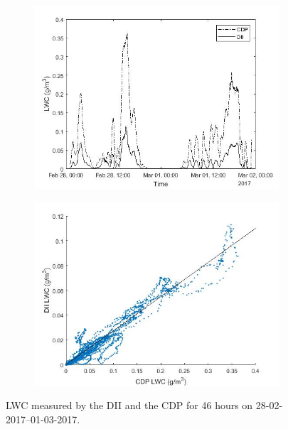 \begin{figure}[ht]
\centering
\begin{subfigure}{.85\textwidth}
  \centering
  \includegraphics[width=1\linewidth]{figures/0228-0301/30min_lwc_CDP_DII_170228-170301_19212_0LpartDII_214646_0LpartCDP}
  \label{fig:0228-0301_LWCvstime}
\end{subfigure}%

\begin{subfigure}{.85\textwidth}
  \centering
  \includegraphics[width=1\linewidth]{figures/0228-0301/Lwcquote_DII-CDP_17022801-17030123_2760min_leastsquare0_2742}
  \label{fig:0228-0301_LWC_DIIvsCDP}
\end{subfigure}
\caption{LWC measured by the DII and the CDP for 46 hours on 28-02-2017--01-03-2017.}
\label{fig:0228-0301_lwc}
\end{figure}

